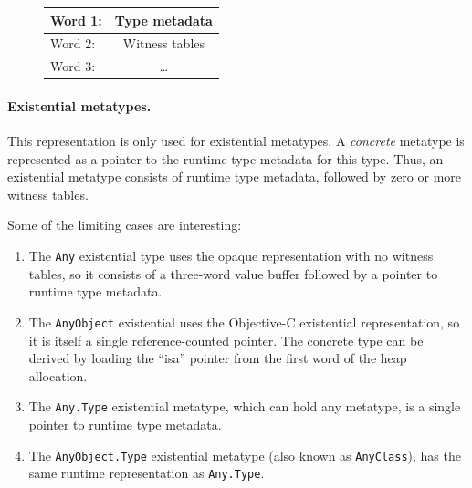\documentclass[../generics]{subfiles}
\begin{document}
\begin{figure}
\begin{minipage}{13em}
\begin{center}
\begin{tabular}{|l|c|}
\hline
Word 1:&Type metadata\\
\hline
\hline
Word 2:&Witness tables\\
Word 3:&\ldots\\
\hline
\end{tabular}
\end{center}
\end{minipage}
\end{figure}

\paragraph{Existential metatypes.} This representation is only used for existential metatypes. A \emph{concrete} metatype is represented as a pointer to the runtime type metadata for this type. Thus, an existential metatype consists of runtime type metadata, followed by zero or more witness tables.

\begin{example}
Some of the limiting cases are interesting:
\begin{enumerate}
\item The \texttt{Any} existential type uses the opaque representation with no witness tables, so it consists of a three-word value buffer followed by a pointer to runtime type metadata.
\item The \texttt{AnyObject} existential uses the Objective-C existential representation, so it is itself a single reference-counted pointer. The concrete type can be derived by loading the ``isa'' pointer from the first word of the heap allocation.

\item The \texttt{Any.Type} existential metatype, which can hold any metatype, is a single pointer to runtime type metadata.

\item The \texttt{AnyObject.Type} existential metatype (also known as \texttt{AnyClass}), has the same runtime representation as \texttt{Any.Type}.
\end{enumerate}
\end{example}
\end{document}
